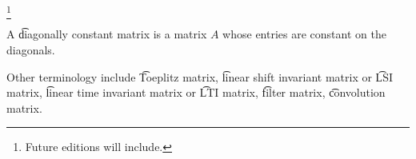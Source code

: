 
\footnote{Future editions will include.}


A \t{diagonally constant matrix} is a matrix $A$ whose entries are constant on the diagonals.

Other terminology include \t{Toeplitz matrix}, \t{linear shift invariant matrix} or \t{LSI matrix}, \t{linear time invariant matrix} or \t{LTI matrix}, \t{filter matrix}, \t{convolution matrix}.

\blankpage

